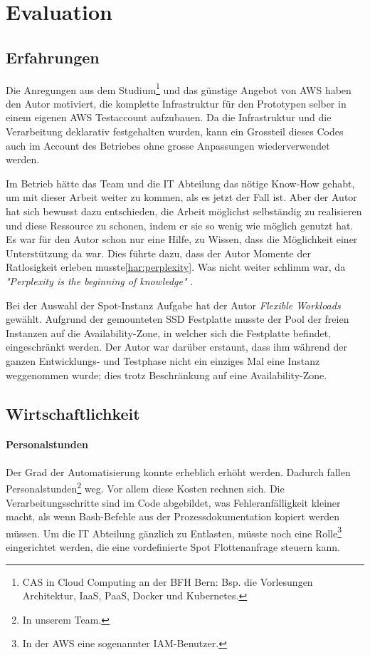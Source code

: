\section{Evaluation}
\subsection{Erfahrungen}
Die Anregungen aus dem Studium\footnote{CAS in Cloud Computing an der BFH Bern: Bsp. die Vorlesungen Architektur, IaaS, PaaS, Docker und Kubernetes.} und das günstige Angebot von AWS haben den Autor motiviert, die komplette Infrastruktur für den Prototypen selber in einem eigenen AWS Testaccount aufzubauen. Da die Infrastruktur und die Verarbeitung deklarativ festgehalten wurden, kann ein Grossteil dieses Codes auch im Account des Betriebes ohne grosse Anpassungen wiederverwendet werden.

Im Betrieb hätte das Team und die IT Abteilung das nötige Know-How gehabt, um mit dieser Arbeit weiter zu kommen, als es jetzt der Fall ist. Aber der Autor hat sich bewusst dazu entschieden, die Arbeit möglichst selbständig zu realisieren und  diese Ressource zu schonen, indem er sie so wenig wie möglich genutzt hat. Es war für den Autor schon nur eine Hilfe, zu Wissen, dass die Möglichkeit einer Unterstützung da war. Dies führte dazu, dass der Autor Momente der Ratlosigkeit erleben musste\ref{har:perplexity}. Was nicht weiter schlimm war, da \textit{"Perplexity is the beginning of knowledge"} \autocite[33]{CloudNativ:1}.

Bei der Auswahl der Spot-Instanz Aufgabe hat der Autor \emph{Flexible Workloads} gewählt. Aufgrund der gemounteten SSD Festplatte musste der Pool der freien Instanzen auf die Availability-Zone, in welcher sich die Festplatte befindet, eingeschränkt werden. Der Autor war darüber erstaunt, dass ihm während der ganzen Entwicklungs- und Testphase nicht ein einziges Mal eine Instanz weggenommen wurde; dies trotz Beschränkung auf eine Availability-Zone.


\subsection{Wirtschaftlichkeit}
\paragraph{Personalstunden}
Der Grad der Automatisierung konnte erheblich erhöht werden. Dadurch fallen Personalstunden\footnote{In unserem Team.} weg. Vor allem diese Kosten rechnen sich. Die Verarbeitungsschritte sind im Code abgebildet, was Fehleranfälligkeit kleiner macht, als wenn Bash-Befehle aus der Prozessdokumentation kopiert werden müssen. Um die IT Abteilung gänzlich zu Entlasten, müsste noch eine Rolle\footnote{In der AWS eine sogenannter IAM-Benutzer.} eingerichtet werden, die eine vordefinierte Spot Flottenanfrage steuern kann.
